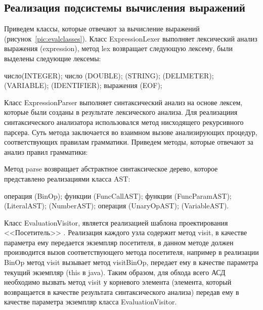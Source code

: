 \documentclass[14pt,a4paper]{reportmod}
\begin{document}
\subsection{Реализация подсистемы вычисления выражений}

Приведем классы, которые отвечают за вычисление выражений (рисунок~\ref{pic:evalclasses}). Класс ExpressionLexer выполняет лексический анализ выражения (expression), метод lex возвращает следующую лексему, были выделены следующие лексемы:

\begin{itemize}
   число(INTEGER);
   число (DOUBLE);
   (STRING);
   (DELIMETER);
   (VARIABLE);
   (IDENTIFIER);
   выражения (EOF);
\end{itemize}

Класс ExpressionParser выполняет синтаксический анализ на основе лексем, которые были созданы в результате лексического анализа. Для реализациия синтаксического анализатора использовался метод нисходящего рекурсивного парсера. Суть метода заключается во взаимном вызове анализирующих процедур, соответствующих правилам грамматики. Приведем методы, которые отвечают за анализ правил грамматики:
\begin{gostitemize}
\end{gostitemize}
Метод parse возвращает абстрактное синтаксическое дерево, которое представлено реализациями класса AST:
\begin{itemize}
   операция (BinOp);
   функции (FuncCallAST);
   функции (FuncParamAST);
   (LiteralAST);
   (NumberAST);
   операция (UnaryOpAST);
   (VariableAST).
\end{itemize}

Класс EvaluationVisitor, является реализацией шаблона проектирования <<Посетитель>> \cite{patterni}. Реализация каждого узла содержит метод visit, в качестве параметра ему передается экземпляр посетителя, в данном методе должен производится вызов соответствующего метода посетителя, например в реализации BinOp метод visit вызывает метод visitBinOp, передает ему в качестве параметра текущий экземпляр (this в java). Таким образом, для обхода всего АСД необходимо вызвать метод visit у корневого элемента (элемента, который возвращается в качестве результата синтаксического анализа) передав ему в качестве параметра экземпляр класса EvaluationVisitor.
\end{document}
